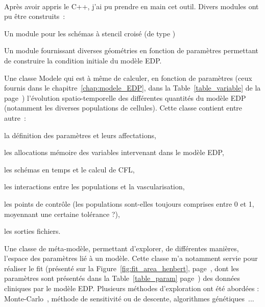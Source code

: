 \documentclass[main.tex]{subfiles}
\begin{document}
\paragraph{}
Après avoir appris le C++, j'ai pu prendre en main cet outil. Divers modules ont pu être construits~:
\begin{myitemize}
\item Un module pour les schémas à stencil croisé (de type \twinweno)
\item Un module fournissant diverses géométries en fonction de paramètres permettant de construire la condition initiale du modèle EDP.
\item Une classe Modele qui est à même de calculer, en fonction de paramètres (ceux fournis dans le chapitre~\ref{chap:modele_EDP}, dans la Table~\ref{table_variable} de la  page~\pageref{table_variable}) l'évolution spatio-temporelle des différentes quantités du modèle EDP (notamment les diverses populations de cellules). 
Cette classe contient entre autre~:
\begin{myitemize}[label=--]
\item la définition des paramètres et leurs affectations,
\item les allocations mémoire des variables intervenant dans le modèle EDP,
\item les schémas en temps et le calcul de CFL, 
\item les interactions entre les populations et la vascularisation, 
\item les points de contrôle (les populations sont-elles toujours comprises entre 0 et 1, moyennant une certaine tolérance ?),
\item les sorties fichiers.
\end{myitemize}
\item Une classe de méta-modèle, permettant d'explorer, de différentes manières, l'espace des paramètres lié à un modèle. Cette classe m'a notamment servie pour réaliser le fit (présenté sur la Figure~\ref{fig:fit_area_henbert}, page~\pageref{fig:fit_area_henbert}, dont les paramètres sont présentés dans la Table~\ref{table_param} page~\pageref{table_param}) des données cliniques par le modèle EDP. Plusieurs méthodes d'exploration ont été abordées : Monte-Carlo~\cite{spall2005introduction}, méthode de sensitivité ou de descente, algorithmes génétiques~\cite{davis1987genetic,goldberg1994algorithmes}... 
\end{myitemize}
\end{document}
